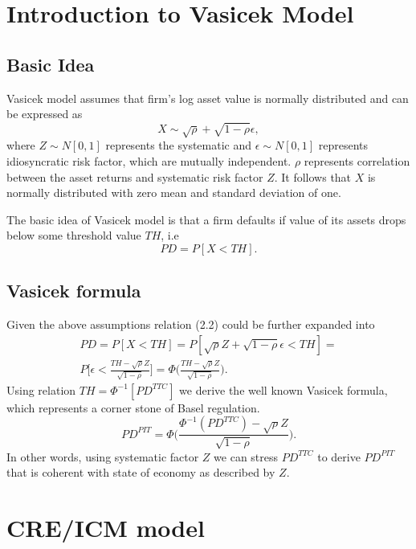 \documentclass[a4paper]{book}
\begin{document}
\section{Introduction to Vasicek Model}

\subsection{Basic Idea}

Vasicek model assumes that firm's log asset value is normally distributed and can be expressed as
\begin{equation}
X \sim \sqrt{\rho} + \sqrt{1 - \rho} \epsilon,
\end{equation}
where $Z \sim N[0, 1]$ represents the systematic and $\epsilon \sim N[0, 1]$ represents idiosyncratic risk factor, which are mutually independent. $\rho$ represents correlation between the asset returns and systematic risk factor $Z$. It follows that $X$ is normally distributed with zero mean and standard deviation of one.

The basic idea of Vasicek model is that a firm defaults if value of its assets drops below some threshold value $TH$, i.e
\begin{equation}
PD = P[X < TH].
\end{equation}

\subsection{Vasicek formula}

Given the above assumptions relation (2.2) could be further expanded into
\begin{multline}
PD = P[X < TH] = P[\sqrt{\rho}Z + \sqrt{1 - \rho} \epsilon < TH] =\\
P \Big[\epsilon < \frac{TH - \sqrt{\rho}Z}{\sqrt{1 - \rho}}\Big] = \Phi \Big(\frac{TH - \sqrt{\rho}Z}{\sqrt{1 - \rho}}\Big).
\end{multline}
Using relation $TH = \Phi^{-1}[PD^{TTC}]$ we derive the well known Vasicek formula, which represents a corner stone of Basel regulation.
\begin{equation}
PD^{PIT} = \Phi \Big(\frac{\Phi^{-1}(PD^{TTC}) - \sqrt{\rho}Z}{\sqrt{1 - \rho}}\Big).
\end{equation}
In other words, using systematic factor $Z$ we can stress $PD^{TTC}$ to derive $PD^{PIT}$ that is coherent with state of economy as described by $Z$.

\section{CRE/ICM model}
\end{document}
